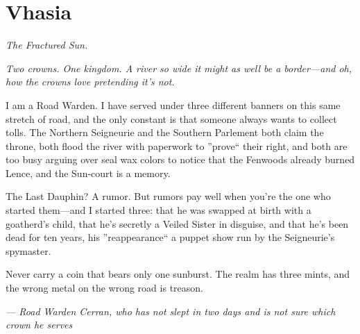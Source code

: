 \newpage

\newpage

\chapter{Vhasia}
\emph{The Fractured Sun.}

\noindent
{\Large
\textit{Two crowns. One kingdom. A river so wide it might as well be a border---and oh, how the crowns love pretending it's not.}

\vspace{0.5em}

I am a Road Warden. I have served under three different banners on this same stretch of road, and the only constant is that someone always wants to collect tolls. The Northern Seigneurie and the Southern Parlement both claim the throne, both flood the river with paperwork to ''prove`` their right, and both are too busy arguing over seal wax colors to notice that the Fenwoods already burned Lence, and the Sun-court is a memory.

\vspace{0.5em}

The Last Dauphin? A rumor. But rumors pay well when you're the one who started them---and I started three: that he was swapped at birth with a goatherd's child, that he's secretly a Veiled Sister in disguise, and that he's been dead for ten years, his ''reappearance`` a puppet show run by the Seigneurie's spymaster.

\vspace{0.5em}

Never carry a coin that bears only one sunburst. The realm has three mints, and the wrong metal on the wrong road is treason.

\vspace{1em}

\noindent\textit{--- Road Warden Cerran, who has not slept in two days and is not sure which crown he serves}
}

\vspace{1em}

